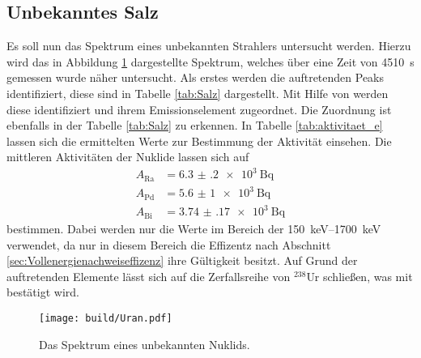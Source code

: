 \subsection{Unbekanntes Salz}
\label{sec:Salz}
Es soll nun das Spektrum eines unbekannten Strahlers untersucht werden. Hierzu wird das in Abbildung \ref{fig:Salz}
dargestellte Spektrum, welches über eine Zeit von \SI{4510}{\second} gemessen wurde näher untersucht.
Als erstes werden die auftretenden Peaks identifiziert, diese sind in Tabelle \ref{tab:Salz} dargestellt.
Mit Hilfe von \cite{referenz1} werden diese identifiziert und ihrem Emissionselement zugeordnet. Die Zuordnung ist
ebenfalls in der Tabelle \ref{tab:Salz} zu erkennen.
In Tabelle \ref{tab:aktivitaet_e} lassen sich die ermittelten Werte zur Bestimmung der Aktivität einsehen.
Die mittleren Aktivitäten der Nuklide lassen sich auf
\begin{align*}
  A_\text{Ra} & = \SI{6.3(2)e3}{\becquerel} \\
  A_\text{Pd} & = \SI{5.6(10)e3}{\becquerel} \\
  A_\text{Bi} & = \SI{3.74(17)e3}{\becquerel}
\end{align*}
bestimmen. Dabei werden nur die Werte im Bereich der \SIrange{150}{1700}{\kilo\electronvolt} verwendet, 
da nur in diesem Bereich die Effizentz nach Abschnitt \ref{sec:Vollenergienachweiseffizenz} ihre Gültigkeit besitzt.
Auf Grund der auftretenden Elemente lässt sich auf die Zerfallsreihe
von ${}^{238}$Ur schließen, was mit \cite{referenz1} bestätigt wird.


\begin{figure}[htb]
 \centering
 \texttt{[image: build/Uran.pdf]}
 \caption{Das Spektrum eines unbekannten Nuklids.}
 \label{fig:Salz}
\end{figure}


